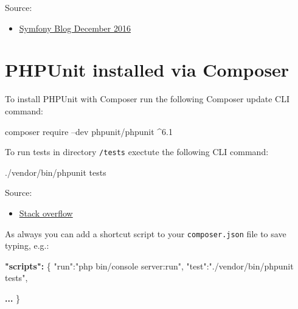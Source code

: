\documentclass[a4paperpaper,openright]{book}
\newenvironment{Shaded}{}{}
\newcommand{\DataTypeTok}[1]{\textcolor[rgb]{0.56,0.13,0.00}{#1}}
\newcommand{\ErrorTok}[1]{\textcolor[rgb]{1.00,0.00,0.00}{\textbf{#1}}}
\newcommand{\ExtensionTok}[1]{#1}
\newcommand{\FunctionTok}[1]{\textcolor[rgb]{0.02,0.16,0.49}{#1}}
\newcommand{\NormalTok}[1]{#1}
\newcommand{\StringTok}[1]{\textcolor[rgb]{0.25,0.44,0.63}{#1}}
\providecommand{\tightlist}{%
  \setlength{\itemsep}{0pt}\setlength{\parskip}{0pt}}
\begin{document}
Source:

\begin{itemize}
\tightlist
\item
  \href{http://symfony.com/blog/how-to-solve-phpunit-issues-in-symfony-3-2-applications}{Symfony
  Blog December 2016}
\end{itemize}

\hypertarget{phpunit-installed-via-composer}{%
\section{PHPUnit installed via
Composer}\label{phpunit-installed-via-composer}}

To install PHPUnit with Composer run the following Composer update CLI
command:

\begin{Shaded}
\begin{Highlighting}[]
    \ExtensionTok{composer}\NormalTok{ require --dev phpunit/phpunit ^6.1}
\end{Highlighting}
\end{Shaded}

To run tests in directory \texttt{/tests} exectute the following CLI
command:

\begin{Shaded}
\begin{Highlighting}[]
    \ExtensionTok{./vendor/bin/phpunit}\NormalTok{ tests}
\end{Highlighting}
\end{Shaded}

Source:

\begin{itemize}
\tightlist
\item
  \href{https://stackoverflow.com/questions/13764309/how-to-use-phpunit-installed-from-composer}{Stack
  overflow}
\end{itemize}

As always you can add a shortcut script to your \texttt{composer.json}
file to save typing, e.g.:

\begin{Shaded}
\begin{Highlighting}[]
    \ErrorTok{"scripts":} \FunctionTok{\{}
        \DataTypeTok{"run"}\FunctionTok{:}\StringTok{"php bin/console server:run"}\FunctionTok{,}
        \DataTypeTok{"test"}\FunctionTok{:}\StringTok{"./vendor/bin/phpunit tests"}\FunctionTok{,}

        \ErrorTok{...}
    \FunctionTok{\}}
\end{Highlighting}
\end{Shaded}
\end{document}
